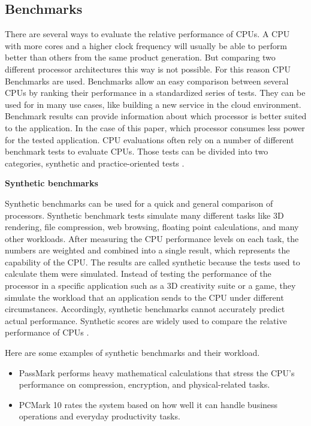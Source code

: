 \subsection{Benchmarks}


There are several ways to evaluate the relative performance of CPUs. A CPU with more cores and a higher clock frequency will usually be able to perform better than others from the same product generation.
But comparing two different processor architectures this way is not possible. For this reason CPU Benchmarks are used. 
Benchmarks allow an easy comparison between several CPUs by ranking their performance in a standardized series of tests. They can be used for in many use cases, like building a new service in the cloud environment. Benchmark results can provide information about which processor is better suited to the application. In the case of this paper, which processor consumes less power for the tested application. 
CPU evaluations often rely on a number of different benchmark tests to evaluate CPUs. Those tests can be divided into two categories, synthetic and practice-oriented tests \cite{Thebench76:online}.

\noindent \textbf{Synthetic benchmarks}

Synthetic benchmarks can be used for a quick and general comparison of processors. 
Synthetic benchmark tests simulate many different tasks like  3D rendering, file compression, web browsing, floating point calculations, and many other workloads. After measuring the CPU performance levels on each task, the numbers are weighted and combined into a single result, which represents the capability of the CPU.
The results are called synthetic because the tests used to calculate them were simulated. Instead of testing the performance of the processor in a specific application such as a 3D creativity suite or a game, they simulate the workload that an application sends to the CPU under different circumstances.
Accordingly, synthetic benchmarks cannot accurately predict actual performance. Synthetic scores are widely used to compare the relative performance of CPUs \cite{Microsof4:online}.

Here are some examples of synthetic benchmarks and their workload.
\begin{itemize}
\item PassMark performs heavy mathematical calculations that stress the CPU's performance on compression, encryption, and physical-related tasks.
\item PCMark 10 rates the system based on how well it can handle business operations and everyday productivity tasks.
\end{itemize} 

